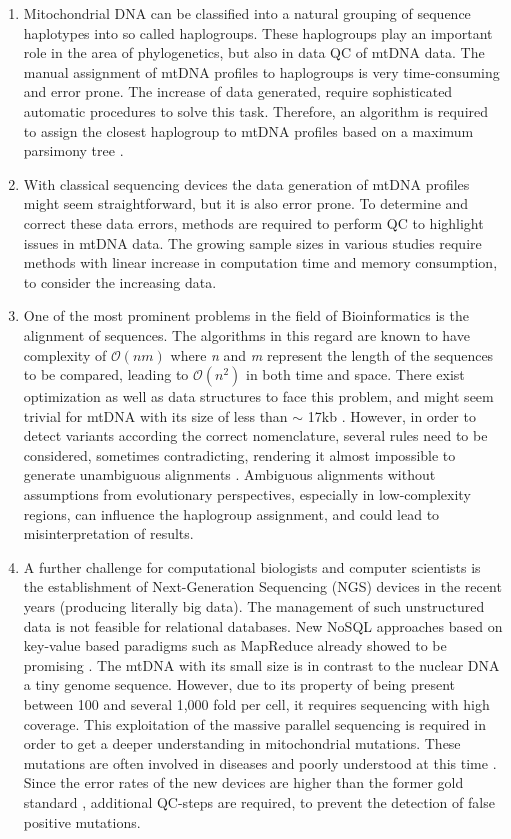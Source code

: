 \begin{enumerate}
\item 
Mitochondrial DNA can be classified into a natural grouping of sequence haplotypes into so called haplogroups. These haplogroups play an important role in the area of phylogenetics, but also in data QC of mtDNA data. The manual assignment of mtDNA profiles to haplogroups is very time-consuming and error prone. The increase of data generated, require sophisticated automatic procedures to solve this task. Therefore, an algorithm is required to assign the closest haplogroup to mtDNA profiles based on a maximum parsimony tree \cite{VanOven2009}. 
\item
With classical sequencing devices the data generation of mtDNA profiles might seem straightforward, but it is also error prone. To determine and correct these data errors, methods are required to perform QC to highlight issues in mtDNA data. The growing sample sizes in various studies require methods with linear increase in computation time and memory consumption, to consider the increasing data. 
\item 
One of the most prominent problems in the field of Bioinformatics is the alignment of sequences. The algorithms in this regard are known to have complexity of $\mathcal O(nm)$ where \textit{n} and \textit{m} represent the length of the sequences to be compared, leading to $\mathcal O(n^2)$ in both time and space. There exist optimization as well as data structures to face this problem, and might seem trivial for mtDNA with its size of less than $\sim$ 17kb \cite{Andrews1999}. However, in order to detect variants according the correct nomenclature, several rules need to be considered, sometimes contradicting, rendering it almost impossible to generate unambiguous alignments \cite{Bandelt2008}. Ambiguous alignments without assumptions from evolutionary perspectives, especially in low-complexity regions, can influence the haplogroup assignment, and could lead to misinterpretation of results.  
\item 
A further challenge for computational biologists and computer scientists is the establishment of Next-Generation Sequencing (NGS) devices in the recent years (producing literally big data). The management of such unstructured data is not feasible for relational databases. New NoSQL approaches based on key-value based paradigms such as MapReduce \cite{Dean2008} already showed to be promising \cite{Schonherr2012}. The mtDNA with its small size is in contrast to the nuclear DNA a tiny genome sequence. However, due to its property of being present between 100 and several 1,000 fold per cell, it requires sequencing with high coverage. This exploitation of the massive parallel sequencing is required in order to get a deeper understanding in mitochondrial mutations. These mutations are often involved in diseases and poorly understood at this time \cite{Wallace2013}. Since the error rates of the new devices are higher than the former gold standard \cite{Wang2011}, additional QC-steps are required, to prevent the detection of false positive mutations. 

\end{enumerate}

